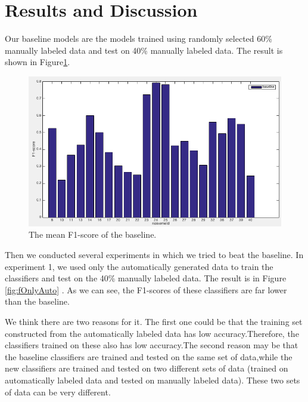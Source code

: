 \documentclass[conference, 11pt, onecolumn]{IEEEtran}
\begin{document}
\label{section:experiments}

\section{Results and Discussion}
Our baseline models are the models trained using randomly selected 60\% manually labeled data and test on 40\% manually labeled data. 
The result is shown in Figure\ref{fig:baseline}.

\begin{figure}[h!]
\centering
\includegraphics[scale=0.45]{figure/baseline.png}
\caption{The mean F1-score of the baseline.}
\label{fig:baseline}
\end{figure}

Then we conducted several experiments in which we tried to beat the baseline. 
In experiment 1, we used only the automatically generated data to train the classifiers and test on the 40\% manually labeled data. 
The result is in Figure \ref{fig:fOnlyAuto} . As we can see, the F1-scores of these classifiers are far lower than the baseline.

We think there are two reasons for it. 
The first one could be that the training set constructed from the automatically labeled data has low accuracy.Therefore, the classifiers trained on these also has low accuracy.The second reason may be that the baseline classifiers are trained and tested on the same set of data,while the new classifiers are trained and tested on two different sets of data (trained on automatically labeled data and tested on manually labeled data). These two sets of data can be very different.
\end{document}
